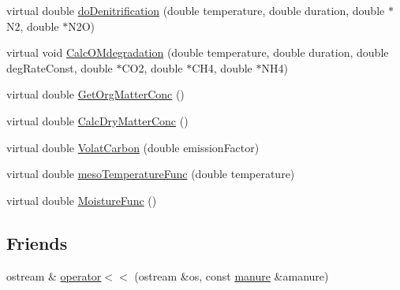 \begin{DoxyCompactItemize}
\item 
virtual double \hyperlink{classmanure_a9005bcd6e277a3f993b1c67b90edfb35}{doDenitrification} (double temperature, double duration, double $\ast$N2, double $\ast$N2O)
\item 
virtual void \hyperlink{classmanure_a8262006c9db5b1e7fcdb0b73e8f23260}{CalcOMdegradation} (double temperature, double duration, double degRateConst, double $\ast$CO2, double $\ast$CH4, double $\ast$NH4)
\item 
virtual double \hyperlink{classmanure_ad293bc0666ccc034fe1f15a1df2a4010}{GetOrgMatterConc} ()
\item 
virtual double \hyperlink{classmanure_a8c330c3c3c05dc44b7c75eae581b717c}{CalcDryMatterConc} ()
\item 
virtual double \hyperlink{classmanure_ae63202774deb8721397a915d15679dba}{VolatCarbon} (double emissionFactor)
\item 
virtual double \hyperlink{classmanure_a1a9772a5fe0cdc749b004b175abcfa3c}{mesoTemperatureFunc} (double temperature)
\item 
virtual double \hyperlink{classmanure_a3e7121336d2d986fcd06766902ebc1e4}{MoistureFunc} ()
\end{DoxyCompactItemize}
\subsection*{Friends}
\begin{DoxyCompactItemize}
\item 
ostream \& \hyperlink{classmanure_a88bca29dfcbb79bbe0a8a0ea33186fcc}{operator$<$$<$} (ostream \&os, const \hyperlink{classmanure}{manure} \&amanure)
\end{DoxyCompactItemize}


